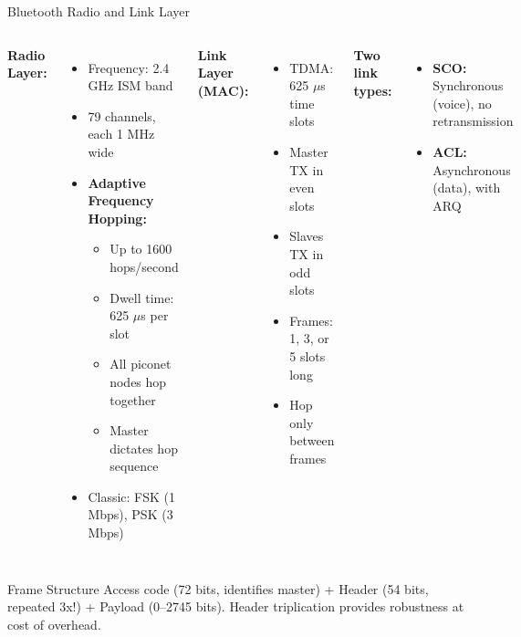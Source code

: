 \documentclass[aspectratio=169,11pt]{beamer}
\begin{document}
\begin{frame}{Bluetooth Radio and Link Layer}
    \begin{columns}
        \textbf{Radio Layer:}
        \begin{itemize}
            \item Frequency: 2.4 GHz ISM band
            \item 79 channels, each 1 MHz wide
            \item \textbf{Adaptive Frequency Hopping:}
            \begin{itemize}
                \item Up to 1600 hops/second
                \item Dwell time: 625 $\mu$s per slot
                \item All piconet nodes hop together
                \item Master dictates hop sequence
            \end{itemize}
            \item Classic: FSK (1 Mbps), PSK (3 Mbps)
        \end{itemize}
        
        \textbf{Link Layer (MAC):}
        \begin{itemize}
            \item TDMA: 625 $\mu$s time slots
            \item Master TX in even slots
            \item Slaves TX in odd slots
            \item Frames: 1, 3, or 5 slots long
            \item Hop only between frames
        \end{itemize}
        
        \vspace{0.2cm}
        \textbf{Two link types:}
        \begin{itemize}
            \item \textbf{SCO:} Synchronous (voice), no retransmission
            \item \textbf{ACL:} Asynchronous (data), with ARQ
        \end{itemize}
    \end{columns}
    
    \vspace{0.3cm}
    \begin{alertblock}{Frame Structure}
        Access code (72 bits, identifies master) + Header (54 bits, repeated 3x!) + Payload (0--2745 bits). Header triplication provides robustness at cost of overhead.
    \end{alertblock}
\end{frame}
\end{document}
